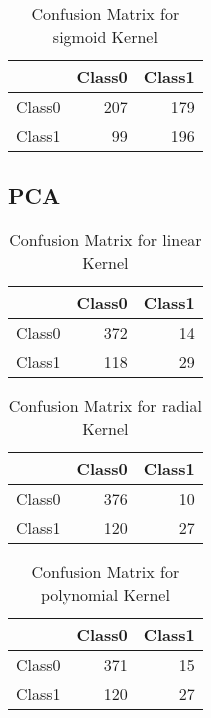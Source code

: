 \begin{table}[H]
\centering
\begin{tabular}{rrr}
  \hline
 & Class0 & Class1 \\ 
  \hline
Class0 & 207 & 179 \\ 
  Class1 &  99 & 196 \\ 
   \hline
\end{tabular}
\caption{Confusion Matrix for sigmoid Kernel} 
\end{table}

\subsection{PCA}

\begin{table}[H]
\centering
\begin{tabular}{rrr}
  \hline
 & Class0 & Class1 \\ 
  \hline
Class0 & 372 &  14 \\ 
  Class1 & 118 &  29 \\ 
   \hline
\end{tabular}
\caption{Confusion Matrix for linear Kernel} 
\end{table}

\begin{table}[H]
\centering
\begin{tabular}{rrr}
  \hline
 & Class0 & Class1 \\ 
  \hline
Class0 & 376 &  10 \\ 
  Class1 & 120 &  27 \\ 
   \hline
\end{tabular}
\caption{Confusion Matrix for radial Kernel} 
\end{table}

\begin{table}[H]
\centering
\begin{tabular}{rrr}
  \hline
 & Class0 & Class1 \\ 
  \hline
Class0 & 371 &  15 \\ 
  Class1 & 120 &  27 \\ 
   \hline
\end{tabular}
\caption{Confusion Matrix for polynomial Kernel} 
\end{table}

